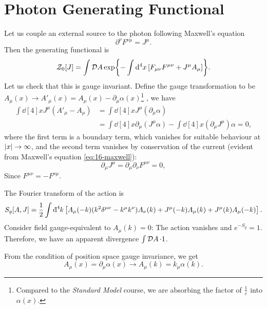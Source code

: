 
\section{Photon Generating Functional}%
\label{sec:photon_generating_functional}

Let us couple an external source to the photon following Maxwell's equation
\begin{equation}
  \label{eq:16-maxwell}
  \partial^{\nu} F^{\nu\mu} = J^{\mu}.
\end{equation}
Then the generating functional is
\begin{equation}
  \mathcal{Z}_0[J] = \int \pdd{A} \exp{- \int \dd[4]{x} [F_{\mu\nu} F^{\mu\nu} + J^{\mu} A_{\mu}]}.
\end{equation}
Let us check that this is gauge invariant.
Define the gauge transformation to be $A_{\mu}(x) \to A'_{\mu}(x) = A_{\mu}(x) - \partial_{\mu} \alpha(x)$\footnote{Compared to the \emph{Standard Model} course, we are absorbing the factor of $\frac{1}{e}$ into $\alpha(x)$.}
, we have
\begin{align}
  \int \dd[4]{x} J^{\mu} (A'_{\mu} - A_{\mu}) &= \int \dd[4]{x} J^{\mu}(\partial_{\mu} \alpha) \\
					      &= \int \dd[4]{x} \partial_{\mu} (J^{\mu} \alpha ) - \int \dd[4]{x} (\partial_{\mu} J^{\mu})\alpha = 0,
\end{align}
where the first term is a boundary term, which vanishes for suitable behaviour at $\abs{x} \to \infty$, and the second term vanishes by conservation of the current (evident from Maxwell's equation \eqref{eq:16-maxwell}):
\begin{equation}
  \partial_{\mu} J^{\mu} = \partial_{\mu} \partial_{\nu} F^{\mu\nu} = 0,
\end{equation}
Since $F^{\mu\nu} = - F^{\nu\mu}$.

The Fourier transform of the action is
\begin{equation}
  S_g[A, J] = \frac{1}{2} \int \bdd[4]{k} \left[ A_{\mu}(-k) (k^2 \delta^{\mu\nu} - k^{\mu} k^{\nu}) A_{\nu}(k) + J^{\mu}(-k) A_{\mu}(k) + J^{\mu}(k) A_{\mu}(-k) \right].
\end{equation}
Consider field gauge-equivalent to $A_{\mu}(k) = 0$: The action vanishes and $e^{-S_g} = 1$. Therefore, we have an apparent divergence $\int \pdd{A} \cdot 1$.

From the condition of position space gauge invariance, we get
\begin{equation}
  A_{\mu}(x) = \partial_{\mu} \alpha(x) \to A_{\mu}(k) = k_{\mu} \alpha(k).
\end{equation}

